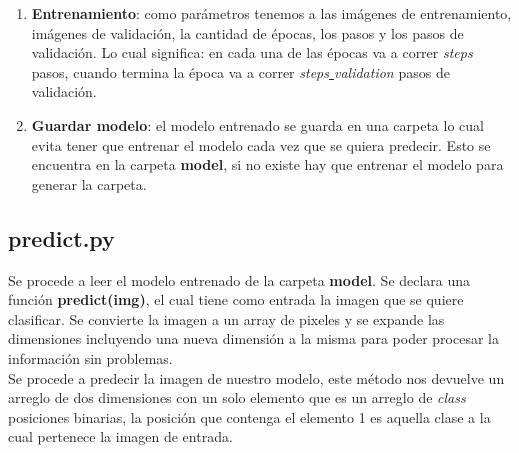 \documentclass{book}
\begin{document}
\begin{enumerate}
						\item \textbf{Entrenamiento}: como par\'ametros tenemos a las im\'agenes de entrenamiento, im\'agenes de validaci\'on, la cantidad de \'epocas, los pasos y los pasos de validaci\'on. Lo cual significa: en cada una de las \'epocas va a correr \textit{steps} pasos, cuando termina la \'epoca va a correr \textit{steps\underline{ }validation} pasos de validaci\'on.
						\item \textbf{Guardar modelo}: el modelo entrenado se guarda en una carpeta lo cual evita tener que entrenar el modelo cada vez que se quiera predecir. Esto se encuentra en la carpeta \textbf{model}, si no existe hay que entrenar el modelo para generar la carpeta.
					\end{enumerate}	
				
			\subsection{predict.py} \label{predict}
				Se procede a leer el modelo entrenado de la carpeta \textbf{model}. Se declara una funci\'on \textbf{predict(img)}, el cual tiene como entrada la imagen que se quiere clasificar. Se convierte la imagen a un array de pixeles y se expande las dimensiones incluyendo una nueva dimensi\'on a la misma para poder procesar la informaci\'on sin problemas.\\
				Se procede a predecir la imagen de nuestro modelo, este m\'etodo nos devuelve un arreglo de dos dimensiones con un solo elemento que es un arreglo de \textit{class\underline{}} posiciones binarias, la posici\'on que contenga el elemento 1 es aquella clase a la cual pertenece la imagen de entrada. 
\end{document}
